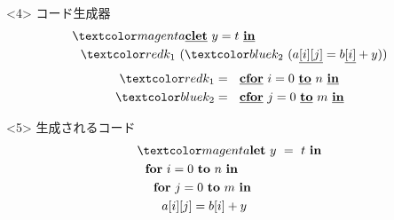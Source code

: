 \begin{frame}
  \begin{onlyenv}<4>
    コード生成器
    \begin{align*}
      & \magenta{\cLet~y=t~\cIn} \\
      & ~~\red{k_1}~(\blue{k_2}~(a\cArrays{i}{j} = b\cArray{i} + y))
    \end{align*}
    \begin{align*}
      \red{k_1} &= ~~\cforin{i = 0}{n} \\
      \blue{k_2} &= ~~\cforin{j = 0}{m} \\
    \end{align*}
  \end{onlyenv}

  \begin{onlyenv}<5>
    生成されるコード
    \begin{align*}
          & \magenta{\Let ~y ~= ~t ~\In} \\
          & ~~\forin{i = 0}{n} \\
          & ~~~~\forin{j = 0}{m} \\
          & ~~~~~~a[i][j] = b[i] + y \\
    \end{align*}
  \end{onlyenv}
\end{frame}

